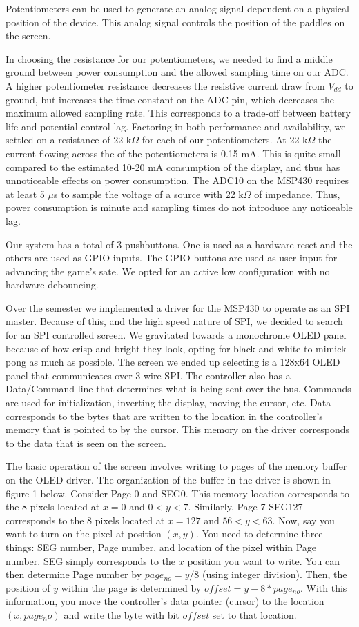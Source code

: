 \documentclass{article}
\begin{document}
Potentiometers can be used to generate an analog signal dependent on a physical position of the device. This analog signal controls the position of the paddles on the screen.

In choosing the resistance for our potentiometers, we needed to find a middle ground between power consumption and the allowed sampling time
on our ADC. A higher potentiometer resistance decreases the resistive current draw from $V_{dd}$ to ground, but increases the time constant on the ADC pin, which decreases the maximum allowed sampling rate. This corresponds to a trade-off between battery life and potential control lag.
Factoring in both performance and availability, we settled on a resistance of 22 k$\Omega$ for each of our potentiometers. At 22 k$\Omega$ the current flowing across the of the potentiometers is 0.15 mA. This is quite small compared to the estimated 10-20 mA consumption of the display, and thus has unnoticeable effects on power consumption. The ADC10 on the MSP430 requires at least 5 $\mu$s to sample the voltage of a source with 22 k$\Omega$ of impedance.
Thus, power consumption is minute and sampling times do not introduce any noticeable lag.

Our system has a total of 3 pushbuttons. One is used as a hardware reset and the others are used as GPIO inputs. The GPIO buttons are used as user input for advancing the game's sate. We opted for an active low configuration with no hardware debouncing.


Over the semester we implemented a driver for the MSP430 to operate as an SPI master. Because of this, and the high speed nature of SPI, we decided to search for an SPI controlled screen. We gravitated towards a monochrome OLED panel because of how crisp and bright they look, opting for black and white to mimick pong as much as possible. The screen we ended up selecting is a 128x64 OLED panel that communicates over 3-wire SPI. The controller also has a Data/Command line that determines what is being sent over the bus. Commands are used for initialization, inverting the display, moving the cursor, etc. Data corresponds to the bytes that are written to the location in the controller's memory that is pointed to by the cursor. This memory on the driver corresponds to the data that is seen on the screen.

The basic operation of the screen involves writing to pages of the memory buffer on the OLED driver. The organization of the buffer in the driver is shown in figure 1 below. Consider Page 0 and SEG0. This memory location corresponds to the 8 pixels located at $x=0$ and $0<y<7$. Similarly, Page 7 SEG127 corresponds to the 8 pixels located at $x=127$ and $56<y<63$. Now, say you want to turn on the pixel at position $(x,y)$. You need to determine three things: SEG number, Page number, and location of the pixel within Page number.
SEG simply corresponds to the $x$ position you want to write. You can then determine Page number by $page_{no} = y/8$ (using integer division). Then, the position of $y$ within the page is determined by $offset = y-8*page_{no}$. With this information, you move the controller's data pointer (cursor) to the location $(x, page_no)$ and write the byte with bit $offset$ set to that location.
\end{document}
